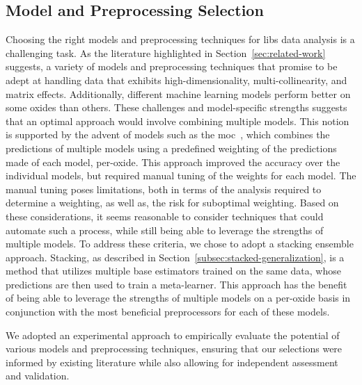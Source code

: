 \subsection{Model and Preprocessing Selection}
Choosing the right models and preprocessing techniques for \gls{libs} data analysis is a challenging task. 
As the literature highlighted in Section~\ref{sec:related-work} suggests, a variety of models and preprocessing techniques that promise to be adept at handling data that exhibits high-dimensionality, multi-collinearity, and matrix effects.
Additionally, different machine learning models perform better on some oxides than others. 
These challenges and model-specific strengths suggests that an optimal approach would involve combining multiple models. 
This notion is supported by the advent of models such as the \gls{moc}~\cite{cleggRecalibrationMarsScience2017}, which combines the predictions of multiple models using a predefined weighting of the predictions made of each model, per-oxide.
This approach improved the accuracy over the individual models, but required manual tuning of the weights for each model.
The manual tuning poses limitations, both in terms of the analysis required to determine a weighting, as well as, the risk for suboptimal weighting.
Based on these considerations, it seems reasonable to consider techniques that could automate such a process, while still being able to leverage the strengths of multiple models.
To address these criteria, we chose to adopt a stacking ensemble approach. 
Stacking, as described in Section~\ref{subsec:stacked-generalization}, is a method that utilizes multiple base estimators trained on the same data, whose predictions are then used to train a meta-learner.
This approach has the benefit of being able to leverage the strengths of multiple models on a per-oxide basis in conjunction with the most beneficial preprocessors for each of these models.

We adopted an experimental approach to empirically evaluate the potential of various models and preprocessing techniques, ensuring that our selections were informed by existing literature while also allowing for independent assessment and validation.

